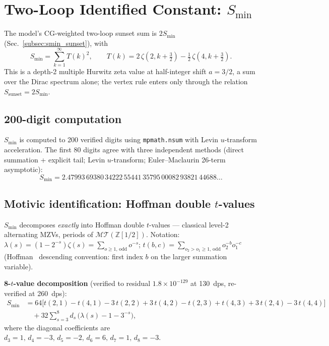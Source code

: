 \documentclass[11pt]{article}
\newcommand{\MT}{\mathcal{MT}}
\newcommand{\Z}{\mathbb{Z}}
\begin{document}
\section{Two-Loop Identified Constant: $S_{\min}$}
\label{sec:smin}

The model's CG-weighted two-loop sunset sum is $2S_{\min}$
(Sec.~\ref{subsec:smin_sunset}), with
\begin{equation}
  S_{\min} = \sum_{k=1}^{\infty} T(k)^2, \qquad
  T(k) = 2\,\zeta(2, k + \tfrac{3}{2})
       - \tfrac{1}{2}\,\zeta(4, k + \tfrac{3}{2}).
  \label{eq:S_min}
\end{equation}
This is a depth-2 multiple Hurwitz zeta value at half-integer shift
$a = 3/2$, a sum over the Dirac spectrum alone; the vertex rule enters
only through the relation $S_{\mathrm{sunset}} = 2S_{\min}$.

\subsection{200-digit computation}

$S_{\min}$ is computed to 200 verified digits using
\texttt{mpmath.nsum} with Levin $u$-transform acceleration.
The first 80 digits agree with three independent methods
(direct summation + explicit tail; Levin $u$-transform; Euler--Maclaurin
26-term asymptotic):
\begin{equation}
  S_{\min} = 2.47993\,69380\,34222\,55441\,35795\,00082\,93821\,44688\ldots
  \label{eq:S_min_value}
\end{equation}

\subsection{Motivic identification: Hoffman double $t$-values}
\label{subsec:smin_identified}

$S_{\min}$ decomposes \emph{exactly} into Hoffman double $t$-values
--- classical level-2 alternating MZVs, periods of $\MT(\Z[1/2])$.
Notation: $\lambda(s) = (1-2^{-s})\zeta(s) = \sum_{o\ge1,\,\mathrm{odd}} o^{-s}$;
$t(b,c) = \sum_{o_2 > o_1 \ge 1,\,\mathrm{odd}} o_2^{-b} o_1^{-c}$
(Hoffman~\cite{hoffman2019odd} descending convention: first index $b$
on the larger summation variable).

\textbf{8-$t$-value decomposition} (verified to residual $1.8\times10^{-129}$ at
130~dps, re-verified at 260~dps):
\begin{align}
  S_{\min} &= 64\bigl[t(2,1) - t(4,1) - 3\,t(2,2) + 3\,t(4,2)
              - t(2,3) + t(4,3) + 3\,t(2,4) - 3\,t(4,4)\bigr]
              \nonumber\\
           &\quad + 32 \sum_{s=3}^{8} d_s\,\bigl(\lambda(s) - 1 - 3^{-s}\bigr),
  \label{eq:Smin_8tvalue}
\end{align}
where the diagonal coefficients are
$d_3=1,\,d_4=-3,\,d_5=-2,\,d_6=6,\,d_7=1,\,d_8=-3$.
\end{document}
